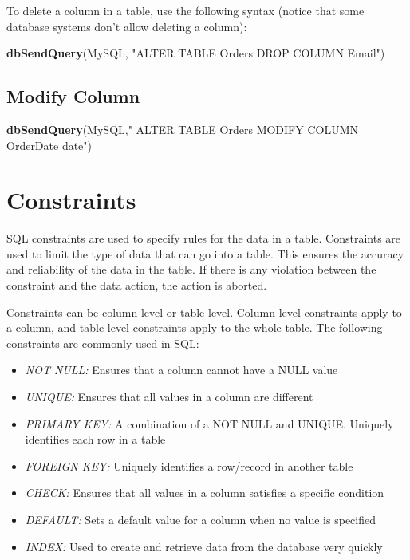 \documentclass[
]{book}
\newenvironment{Shaded}{\begin{snugshade}}{\end{snugshade}}
\newcommand{\FunctionTok}[1]{\textcolor[rgb]{0.13,0.29,0.53}{\textbf{#1}}}
\newcommand{\NormalTok}[1]{#1}
\newcommand{\StringTok}[1]{\textcolor[rgb]{0.31,0.60,0.02}{#1}}
\providecommand{\tightlist}{%
  \setlength{\itemsep}{0pt}\setlength{\parskip}{0pt}}
\begin{document}
To delete a column in a table, use the following syntax (notice that some database systems don't allow deleting a column):

\begin{Shaded}
\begin{Highlighting}[]
\FunctionTok{dbSendQuery}\NormalTok{(MySQL, }\StringTok{"ALTER TABLE Orders}
\StringTok{                   DROP COLUMN Email"}\NormalTok{)}
\end{Highlighting}
\end{Shaded}

\hypertarget{modify-column}{%
\subsection{Modify Column}\label{modify-column}}

\begin{Shaded}
\begin{Highlighting}[]
\FunctionTok{dbSendQuery}\NormalTok{(MySQL,}\StringTok{" ALTER TABLE Orders}
\StringTok{                  MODIFY COLUMN OrderDate date"}\NormalTok{)}
\end{Highlighting}
\end{Shaded}

\hypertarget{constraints}{%
\section{Constraints}\label{constraints}}

SQL constraints are used to specify rules for the data in a table. Constraints are used to limit the type of data that can go into a table. This ensures the accuracy and reliability of the data in the table. If there is any violation between the constraint and the data action, the action is aborted.

Constraints can be column level or table level. Column level constraints apply to a column, and table level constraints apply to the whole table. The following constraints are commonly used in SQL:

\begin{itemize}
\tightlist
\item
  \emph{NOT NULL:} Ensures that a column cannot have a NULL value
\item
  \emph{UNIQUE:} Ensures that all values in a column are different
\item
  \emph{PRIMARY KEY:} A combination of a NOT NULL and UNIQUE. Uniquely identifies each row in a table
\item
  \emph{FOREIGN KEY:} Uniquely identifies a row/record in another table
\item
  \emph{CHECK:} Ensures that all values in a column satisfies a specific condition
\item
  \emph{DEFAULT:} Sets a default value for a column when no value is specified
\item
  \emph{INDEX:} Used to create and retrieve data from the database very quickly
\end{itemize}
\end{document}
